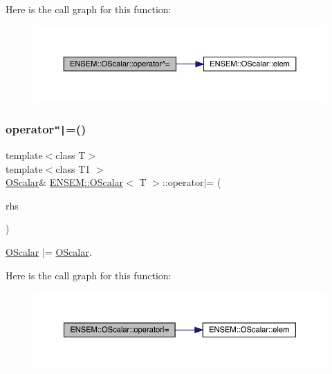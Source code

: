 Here is the call graph for this function\+:
\nopagebreak
\begin{figure}[H]
\begin{center}
\leavevmode
\includegraphics[width=350pt]{da/d80/classENSEM_1_1OScalar_af66decef8e6be220193ad1292a927e2f_cgraph}
\end{center}
\end{figure}
\mbox{\label{classENSEM_1_1OScalar_aeffba612ea04593253d41332d6d2aa82}} 
\subsubsection{\texorpdfstring{operator\texttt{"|}=()}{operator|=()}\hspace{0.1cm}{\footnotesize\ttfamily [1/2]}}
{\footnotesize\ttfamily template$<$class T$>$ \\
template$<$class T1 $>$ \\
\mbox{\hyperlink{classENSEM_1_1OScalar}{O\+Scalar}}\& \mbox{\hyperlink{classENSEM_1_1OScalar}{E\+N\+S\+E\+M\+::\+O\+Scalar}}$<$ T $>$\+::operator$\vert$= (\begin{DoxyParamCaption}\item[{const \mbox{\hyperlink{classENSEM_1_1OScalar}{O\+Scalar}}$<$ T1 $>$ \&}]{rhs }\end{DoxyParamCaption})\hspace{0.3cm}{\ttfamily [inline]}}



\mbox{\hyperlink{classENSEM_1_1OScalar}{O\+Scalar}} $\vert$= \mbox{\hyperlink{classENSEM_1_1OScalar}{O\+Scalar}}. 

Here is the call graph for this function\+:
\nopagebreak
\begin{figure}[H]
\begin{center}
\leavevmode
\includegraphics[width=350pt]{da/d80/classENSEM_1_1OScalar_aeffba612ea04593253d41332d6d2aa82_cgraph}
\end{center}
\end{figure}
\mbox{\label{classENSEM_1_1OScalar_aeffba612ea04593253d41332d6d2aa82}} 

